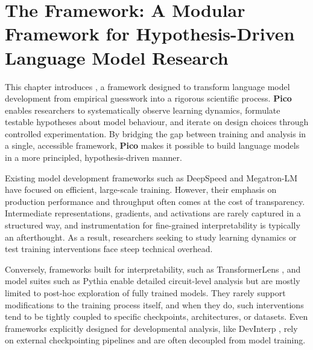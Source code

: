 \chapter[The \picomed Framework: A Modular Framework for Hypothesis-Driven Language Model Research]{The \picosupabig Framework: A Modular Framework for Hypothesis-Driven Language Model Research}
\label{chapter:pico}


This chapter introduces \pico, a framework designed to transform language model development from empirical guesswork into a rigorous scientific process. \textbf{Pico} enables researchers to systematically observe learning dynamics, formulate testable hypotheses about model behaviour, and iterate on design choices through controlled experimentation. By bridging the gap between training and analysis in a single, accessible framework, \textbf{Pico} makes it possible to build language models in a more principled, hypothesis-driven manner. 

Existing model development frameworks such as DeepSpeed \citep{rasley2020deepspeed} and Megatron-LM \citep{narayanan2021megatron} have focused on efficient, large-scale training. However, their emphasis on production performance and throughput often comes at the cost of transparency. Intermediate representations, gradients, and activations are rarely captured in a structured way, and instrumentation for fine-grained interpretability is typically an afterthought. As a result, researchers seeking to study learning dynamics or test training interventions face steep technical overhead.

Conversely, frameworks built for interpretability, such as TransformerLens \citep{nanda2022transformerlens}, and model suites such as Pythia \citep{biderman2023pythia} enable detailed circuit-level analysis but are mostly limited to post-hoc exploration of fully trained models. They rarely support modifications to the training process itself, and when they do, such interventions tend to be tightly coupled to specific checkpoints, architectures, or datasets. Even frameworks explicitly designed for developmental analysis, like DevInterp \citep{devinterpcode}, rely on external checkpointing pipelines and are often decoupled from model training.

